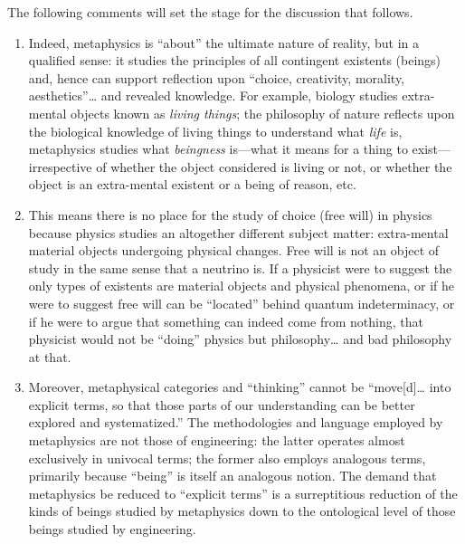 The following comments will set the stage for the discussion that follows.

\begin{enumerate}
\item Indeed, metaphysics is ``about'' the ultimate nature of reality, but in a qualified sense: it studies the principles of all contingent existents (beings) and, hence can support reflection upon ``choice, creativity, morality, aesthetics''\ldots{} and revealed knowledge. For example, biology studies extra-mental objects known as \textit{living things}; the philosophy of nature reflects upon the biological knowledge of living things to understand what \textit{life} is, metaphysics studies what \textit{beingness} is---what it means for a thing to exist---irrespective of whether the object considered is living or not, or whether the object is an extra-mental existent or a being of reason, etc.
\item This means there is no place for the study of choice (free will) in physics because physics studies an altogether different subject matter: extra-mental material objects undergoing physical changes. Free will is not an object of study in the same sense that a neutrino is. If a physicist were to suggest the only types of existents are material objects and physical phenomena, or if he were to suggest free will can be ``located'' behind quantum indeterminacy, or if he were to argue that something can indeed come from nothing, that physicist would not be ``doing'' physics but philosophy\ldots{} and bad philosophy at that.
\item Moreover, metaphysical categories and ``thinking'' cannot be ``move[d]… into explicit terms, so that those parts of our understanding can be better explored and systematized.'' The methodologies and language employed by metaphysics are not those of engineering: the latter operates almost exclusively in univocal terms; the former also employs analogous terms, primarily because ``being'' is itself an analogous notion. The demand that metaphysics be reduced to ``explicit terms'' is a surreptitious reduction of the kinds of beings studied by metaphysics down to the ontological level of those beings studied by engineering.

\end{enumerate}
